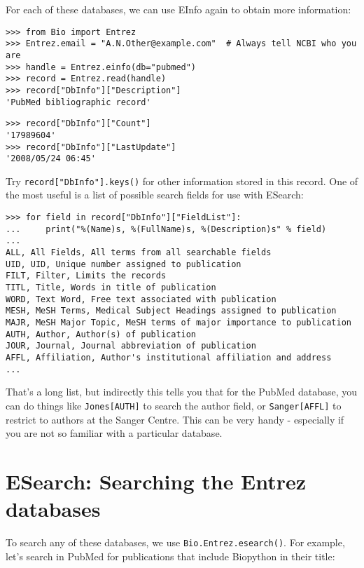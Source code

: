 For each of these databases, we can use EInfo again to obtain more information:

\begin{verbatim}
>>> from Bio import Entrez
>>> Entrez.email = "A.N.Other@example.com"  # Always tell NCBI who you are
>>> handle = Entrez.einfo(db="pubmed")
>>> record = Entrez.read(handle)
>>> record["DbInfo"]["Description"]
'PubMed bibliographic record'
\end{verbatim}
\begin{verbatim}
>>> record["DbInfo"]["Count"]
'17989604'
>>> record["DbInfo"]["LastUpdate"]
'2008/05/24 06:45'
\end{verbatim}
Try \verb+record["DbInfo"].keys()+ for other information stored in this record.
One of the most useful is a list of possible search fields for use with ESearch:

\begin{verbatim}
>>> for field in record["DbInfo"]["FieldList"]:
...     print("%(Name)s, %(FullName)s, %(Description)s" % field)
...
ALL, All Fields, All terms from all searchable fields
UID, UID, Unique number assigned to publication
FILT, Filter, Limits the records
TITL, Title, Words in title of publication
WORD, Text Word, Free text associated with publication
MESH, MeSH Terms, Medical Subject Headings assigned to publication
MAJR, MeSH Major Topic, MeSH terms of major importance to publication
AUTH, Author, Author(s) of publication
JOUR, Journal, Journal abbreviation of publication
AFFL, Affiliation, Author's institutional affiliation and address
...
\end{verbatim}

That's a long list, but indirectly this tells you that for the PubMed
database, you can do things like \texttt{Jones[AUTH]} to search the
author field, or \texttt{Sanger[AFFL]} to restrict to authors at the
Sanger Centre. This can be very handy - especially if you are not so
familiar with a particular database.

\section{ESearch: Searching the Entrez databases}
\label{sec:entrez-esearch}
To search any of these databases, we use \verb+Bio.Entrez.esearch()+. For example, let's search in PubMed for publications that include Biopython in their title:

